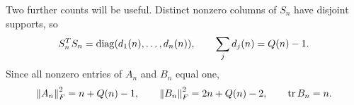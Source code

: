 Two further counts will be useful. Distinct nonzero columns of $S_n$ have disjoint supports, so
\begin{equation}\label{def:orthocolumns}
 S_n^TS_n=\operatorname{diag}(d_1(n),\ldots,d_n(n)),\qquad
 \sum_jd_j(n)=Q(n)-1.
\end{equation}
Since all nonzero entries of $A_n$ and $B_n$ equal one,
\begin{equation}\label{def:frobenius}
 \left\lVert A_n\right\rVert_F^2=n+Q(n)-1,\qquad
 \left\lVert B_n\right\rVert_F^2=2n+Q(n)-2,\qquad \operatorname{tr} B_n=n.
\end{equation}

